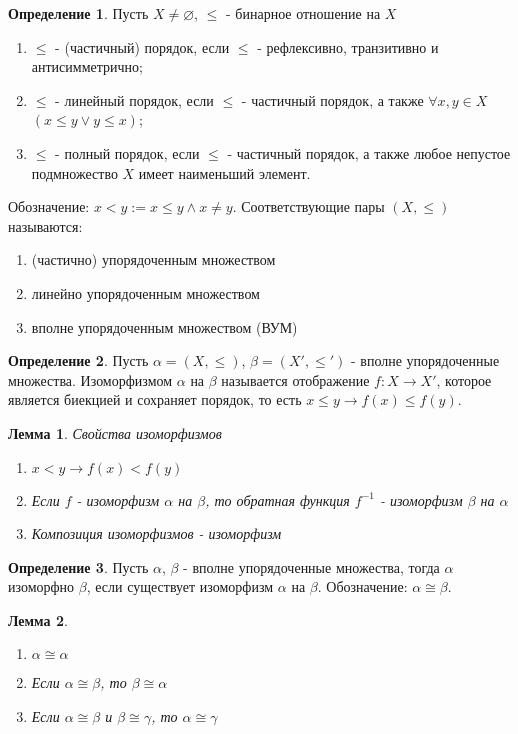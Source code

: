 \documentclass[a4paper, 12pt]{article}
\theoremstyle{definition}
\newtheorem*{definition}{Определение}
\theoremstyle{plain}
\newtheorem*{lemma}{Лемма}
\theoremstyle{remark}
\begin{document}
  \begin{definition}
    Пусть $X\not=\varnothing$, $\leqslant$ - бинарное отношение на $X$
    \begin{enumerate}
      \item $\leqslant$ - (частичный) порядок, если $\leqslant$ - рефлексивно, транзитивно и антисимметрично;
      \item $\leqslant$ - линейный порядок, если $\leqslant$ - частичный порядок, а также $\forall x, y\in X$ $(x\leqslant y\vee y\leqslant x)$;
      \item $\leqslant$ - полный порядок, если $\leqslant$ - частичный порядок, а также любое непустое подмножество $X$ имеет наименьший элемент.
    \end{enumerate}
    Обозначение: $x<y:=x\leqslant y\wedge x\neq y$.
    Соответствующие пары $(X,\leqslant)$ называются:
    \begin{enumerate}
      \item (частично) упорядоченным множеством
      \item линейно упорядоченным множеством
      \item вполне упорядоченным множеством (ВУМ)
    \end{enumerate}
  \end{definition}
  \begin{definition}
    Пусть $\alpha=(X,\leqslant)$, $\beta=(X',\leqslant')$ - вполне упорядоченные множества. Изоморфизмом $\alpha$ на $\beta$ называется отображение $f:X\to X'$, которое является биекцией и сохраняет порядок, то есть $x\leqslant y\to f(x)\leqslant f(y)$.
  \end{definition}
  \begin{lemma}{Свойства изоморфизмов}
    \begin{enumerate}
      \item $x<y\to f(x)<f(y)$
      \item Если $f$ - изоморфизм $\alpha$ на $\beta$, то обратная функция $f^{-1}$ - изоморфизм $\beta$ на $\alpha$
      \item Композиция изоморфизмов - изоморфизм
    \end{enumerate}
  \end{lemma}
  \begin{definition}
    Пусть $\alpha$, $\beta$ - вполне упорядоченные множества, тогда $\alpha$ изоморфно $\beta$, если существует изоморфизм $\alpha$ на $\beta$. Обозначение: $\alpha\cong\beta$.
  \end{definition}
  \begin{lemma}
    \begin{enumerate}
      \item $\alpha\cong\alpha$
      \item Если $\alpha\cong\beta$, то $\beta\cong\alpha$
      \item Если $\alpha\cong\beta$ и $\beta\cong\gamma$, то $\alpha\cong\gamma$
    \end{enumerate}
  \end{lemma}
\end{document}
